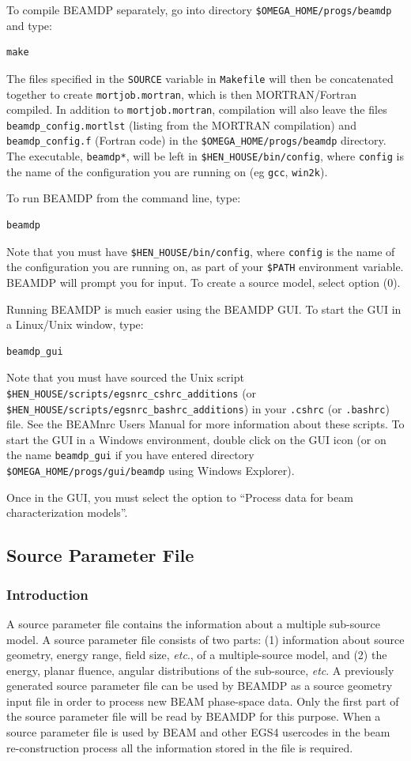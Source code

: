 \documentclass[12pt,twoside]{article}
\newcommand{\etc}{{\em etc}}
\begin{document}
To compile BEAMDP separately, go into directory {\tt \$OMEGA\_HOME/progs/beamdp}
and type:
\begin{verbatim}
make
\end{verbatim}
The files specified in the {\tt SOURCE} variable in {\tt Makefile}
will then be concatenated together to create {\tt mortjob.mortran}, which
is then MORTRAN/Fortran compiled.  In addition to {\tt mortjob.mortran},
compilation will also leave the files {\tt beamdp\_config.mortlst}
(listing from the MORTRAN compilation) and
{\tt beamdp\_config.f} (Fortran code) in the
{\tt \$OMEGA\_HOME/progs/beamdp} directory.  The executable, {\tt beamdp*},
will be left in {\tt \$HEN\_HOUSE/bin/config}, where {\tt config} is the
name of the configuration you are running on (eg {\tt gcc}, {\tt win2k}).

To run BEAMDP from the command line, type:
\begin{verbatim}
beamdp
\end{verbatim}
Note that you must
have {\tt \$HEN\_HOUSE/bin/config}, where {\tt config} is the name
of the configuration you are running on, as part of your {\tt \$PATH}
environment variable.
BEAMDP will prompt you for input.  To create a source model, select
option (0).

Running BEAMDP is much easier using the BEAMDP GUI\cite{Tr04}.  To start the GUI in
a Linux/Unix window, type:
\begin{verbatim}
beamdp_gui
\end{verbatim}
Note that you must have sourced the Unix script
{\tt \$HEN\_HOUSE/scripts/egsnrc\_cshrc\_additions} (or
{\tt \$HEN\_HOUSE/scripts/egsnrc\_bashrc\_additions}) in your
{\tt .cshrc} (or {\tt .bashrc}) file.  See the BEAMnrc Users Manual\cite{Ro04a}
for more information about these scripts.  To start the GUI in a Windows
environment, double click on the GUI icon (or on the name
{\tt beamdp\_gui} if you have entered directory
{\tt \$OMEGA\_HOME/progs/gui/beamdp} using Windows Explorer).

Once in the GUI, you must select the option to
``Process data for beam characterization models''.

\subsection{Source Parameter File}

\subsubsection{Introduction}
A source parameter file contains the information about a multiple sub-source model. A source parameter file consists of two parts: (1) information about source geometry, energy range, field size, \etc., of a multiple-source model, and (2) the energy, planar fluence, angular distributions of the sub-source, \etc.
A previously generated source parameter file  can be used by BEAMDP as a source geometry input file in order to process new BEAM phase-space data. Only the first part of the source parameter file will be read by BEAMDP for this purpose. When a source parameter file is used by BEAM and other EGS4 usercodes in the beam re-construction process all the information stored in the file is required.
\end{document}
